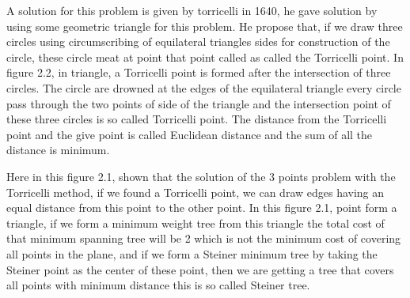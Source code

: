   A solution for this problem is given by torricelli in 1640, he gave solution by using some geometric triangle for this problem. He propose that, if we draw three circles using circumscribing of equilateral triangles sides for construction of the circle, these circle meat at point that point called as called the Torricelli point. In figure 2.2, in triangle, a Torricelli point is formed after the intersection of three circles. The circle are drowned at the edges of the equilateral triangle every circle pass through the two points of side of the triangle and the intersection point of these three circles is so called Torricelli point. The distance from the Torricelli point and the give point is called Euclidean distance and the sum of all the distance is minimum.

   Here in this figure 2.1, shown that the solution of the 3 points problem with the Torricelli method, if we found a Torricelli point, we can draw edges having an equal distance from this point to the other point. In this figure 2.1, point form a triangle, if we form a minimum weight tree from this triangle the total cost of that minimum spanning tree will be 2 which is not the minimum cost of covering all points in the plane, and if we form a Steiner minimum tree by taking the Steiner point as the center of these point, then we are getting a tree that covers all points with minimum distance this is so called Steiner tree.


